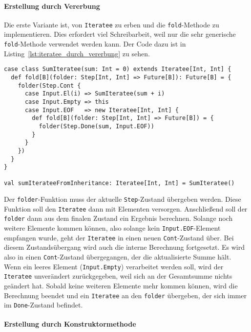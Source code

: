 \paragraph{Erstellung durch Vererbung} %
\label{par:erstellung_durch_vererbung}\mbox{} %

Die erste Variante ist, von \lstinline|Iteratee| zu erben und die \lstinline|fold|-Methode zu implementieren.
Dies erfordert viel Schreibarbeit, weil nur die sehr generische \lstinline|fold|-Methode verwendet werden kann.
Der Code dazu ist in Listing~\ref{lst:iteratee_durch_vererbung} zu sehen.

\begin{lstlisting}[caption=Erstellung eines Iteratees durch Vererbung, label=lst:iteratee_durch_vererbung]
case class SumIteratee(sum: Int = 0) extends Iteratee[Int, Int] {
  def fold[B](folder: Step[Int, Int] => Future[B]): Future[B] = {
    folder(Step.Cont {
      case Input.El(i) => SumIteratee(sum + i)
      case Input.Empty => this
      case Input.EOF   => new Iteratee[Int, Int] {
        def fold[B](folder: Step[Int, Int] => Future[B]) = {
          folder(Step.Done(sum, Input.EOF))
        }
      }
    })
  }
}

val sumIterateeFromInheritance: Iteratee[Int, Int] = SumIteratee()
\end{lstlisting}

Der \lstinline|folder|-Funktion muss der aktuelle \lstinline|Step|-Zustand übergeben werden.
Diese Funktion soll den \lstinline|Iteratee| dann mit Elementen versorgen.
Anschließend soll der \lstinline|folder| dann aus dem finalen Zustand ein Ergebnis berechnen.
Solange noch weitere Elemente kommen können, also solange kein \lstinline|Input.EOF|-Element empfangen wurde, geht der \lstinline|Iteratee| in einen neuen \lstinline|Cont|-Zustand über.
Bei diesem Zustandsübergang wird auch die interne Berechnung fortgesetzt.
Es wird also in einen \lstinline|Cont|-Zustand übergegangen, der die aktualisierte Summe hält.
Wenn ein leeres Element (\lstinline|Input.Empty|) verarbeitet werden soll, wird der \lstinline|Iteratee| unverändert zurückgegeben, weil sich an der Gesamtsumme nichts geändert hat.
Sobald keine weiteren Elemente mehr kommen können, wird die Berechnung beendet und ein \lstinline|Iteratee| an den \lstinline|folder| übergeben, der sich immer im \lstinline|Done|-Zustand befindet.


\paragraph{Erstellung durch Konstruktormethode} %
\label{par:erstellung_durch_konstruktormethode}\mbox{} %

